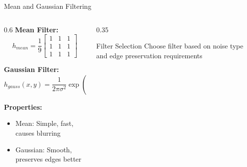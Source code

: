 \documentclass[aspectratio=169,10pt]{beamer}
\begin{document}
\begin{frame}{Mean and Gaussian Filtering}
    \begin{columns}[T]
        \begin{column}{0.6\textwidth}
            \textbf{Mean Filter:}
            $$h_{mean} = \frac{1}{9}\begin{bmatrix}
            1 & 1 & 1 \\
            1 & 1 & 1 \\
            1 & 1 & 1
            \end{bmatrix}$$

            \textbf{Gaussian Filter:}
            $$h_{gauss}(x,y) = \frac{1}{2\pi\sigma^2}\exp\left(-\frac{x^2+y^2}{2\sigma^2}\right)$$

            \textbf{Properties:}
            \begin{itemize}
                \item Mean: Simple, fast, causes blurring
                \item Gaussian: Smooth, preserves edges better
            \end{itemize}
        \end{column}
        \begin{column}{0.35\textwidth}
            \begin{insight}{Filter Selection}{}
                Choose filter based on noise type and edge preservation requirements
            \end{insight}
        \end{column}
    \end{columns}
\end{frame}
\end{document}
